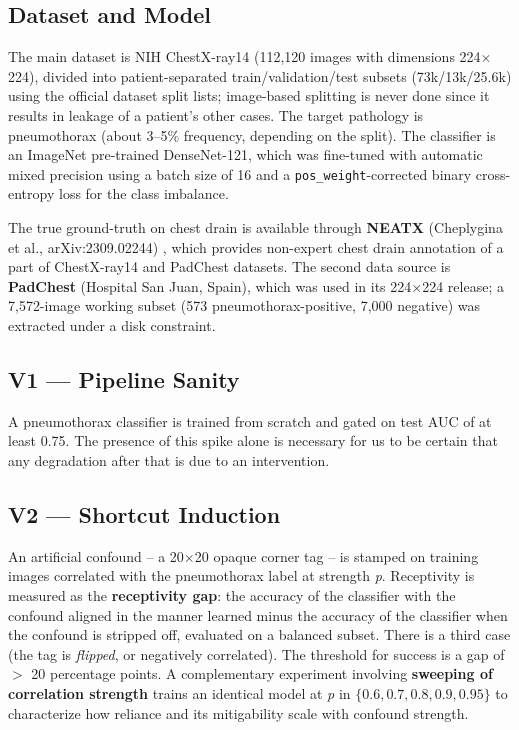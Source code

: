 \documentclass{ieeeaccess}
\begin{document}
\subsection{Dataset and Model}
The main dataset is NIH ChestX-ray14 (112,120 images with dimensions 224$\times$224), divided into patient-separated train/validation/test subsets (73k/13k/25.6k) using the official dataset split lists; image-based splitting is never done since it results in leakage of a patient's other cases. The target pathology is pneumothorax (about 3--5\% frequency, depending on the split). The classifier is an ImageNet pre-trained DenseNet-121, which was fine-tuned with automatic mixed precision using a batch size of 16 and a \texttt{pos\_weight}-corrected binary cross-entropy loss for the class imbalance.

The true ground-truth on chest drain is available through \textbf{NEATX} (Cheplygina et al., arXiv:2309.02244) \cite{neatx}, which provides non-expert chest drain annotation of a part of ChestX-ray14 and PadChest datasets. The second data source is \textbf{PadChest} (Hospital San Juan, Spain), which was used in its 224$\times$224 release; a 7,572-image working subset (573 pneumothorax-positive, 7,000 negative) was extracted under a disk constraint.

\subsection{V1 --- Pipeline Sanity}
A pneumothorax classifier is trained from scratch and gated on test AUC of at least 0.75. The presence of this spike alone is necessary for us to be certain that any degradation after that is due to an intervention.

\subsection{V2 --- Shortcut Induction}
An artificial confound -- a 20$\times$20 opaque corner tag -- is stamped on training images correlated with the pneumothorax label at strength \emph{p}. Receptivity is measured as the \textbf{receptivity gap}: the accuracy of the classifier with the confound aligned in the manner learned minus the accuracy of the classifier when the confound is stripped off, evaluated on a balanced subset. There is a third case (the tag is \emph{flipped}, or negatively correlated). The threshold for success is a gap of $>$ 20 percentage points. A complementary experiment involving \textbf{sweeping of correlation strength} trains an identical model at \emph{p} in $\{0.6, 0.7, 0.8, 0.9, 0.95\}$ to characterize how reliance and its mitigability scale with confound strength.
\end{document}
